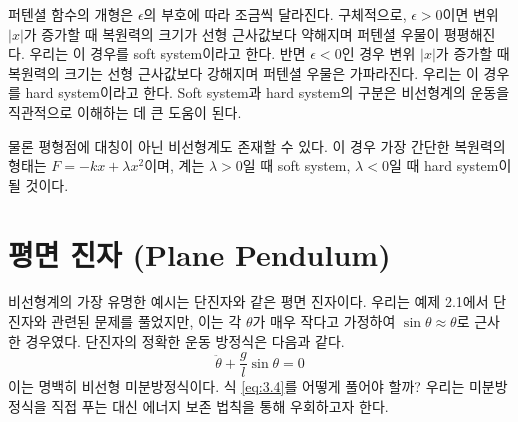 \documentclass[chapter, oneside, b5paper]{oblivoir}
\theoremstyle{plain}
\theoremstyle{definition}
\theoremstyle{remark}
\begin{document}
퍼텐셜 함수의 개형은 $\epsilon$의 부호에 따라 조금씩 달라진다. 구체적으로, $\epsilon>0$이면 변위 $\vert{}x\vert{}$가 증가할 때 복원력의 크기가 선형 근사값보다 약해지며 퍼텐셜 우물이 평평해진다. 우리는 이 경우를 soft system이라고 한다. 반면 $\epsilon<0$인 경우 변위 $\vert{}x\vert{}$가 증가할 때 복원력의 크기는 선형 근사값보다 강해지며 퍼텐셜 우물은 가파라진다. 우리는 이 경우를 hard system이라고 한다. Soft system과 hard system의 구분은 비선형계의 운동을 직관적으로 이해하는 데 큰 도움이 된다.

물론 평형점에 대칭이 아닌 비선형계도 존재할 수 있다. 이 경우 가장 간단한 복원력의 형태는 $F=-kx+\lambda x^2$이며, 계는 $\lambda >0$일 때 soft system, $\lambda<0$일 때 hard system이 될 것이다.

\section{평면 진자 (Plane Pendulum)}
비선형계의 가장 유명한 예시는 단진자와 같은 평면 진자이다. 우리는 예제 2.1에서 단진자와 관련된 문제를 풀었지만, 이는 각 $\theta$가 매우 작다고 가정하여 $\sin{\theta} \approx \theta$로 근사한 경우였다. 단진자의 정확한 운동 방정식은 다음과 같다.
\begin{equation}
    \ddot{\theta}+\frac{g}{l}\sin{\theta} = 0
    \label{eq:3.4}
\end{equation}
이는 명백히 비선형 미분방정식이다. 식 \ref{eq:3.4}를 어떻게 풀어야 할까? 우리는 미분방정식을 직접 푸는 대신 에너지 보존 법칙을 통해 우회하고자 한다.
\end{document}
